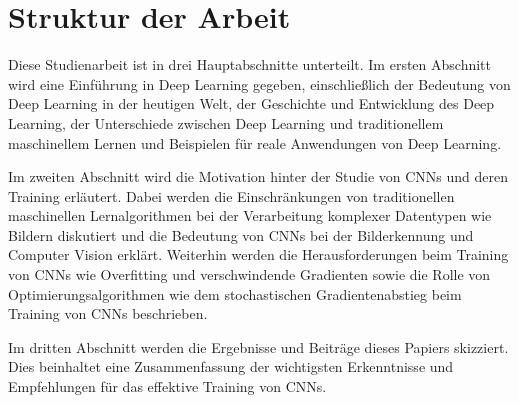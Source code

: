 \section{Struktur der Arbeit}

    Diese Studienarbeit ist in drei Hauptabschnitte unterteilt.
    Im ersten Abschnitt wird eine Einführung in Deep Learning gegeben, einschließlich der Bedeutung von Deep Learning in der heutigen Welt, der Geschichte und Entwicklung des Deep Learning, der Unterschiede zwischen Deep Learning und traditionellem maschinellem Lernen und Beispielen für reale Anwendungen von Deep Learning.
    
    Im zweiten Abschnitt wird die Motivation hinter der Studie von CNNs und deren Training erläutert. Dabei werden die Einschränkungen von traditionellen maschinellen Lernalgorithmen bei der Verarbeitung komplexer Datentypen wie Bildern diskutiert und die Bedeutung von CNNs bei der Bilderkennung und Computer Vision erklärt. Weiterhin werden die Herausforderungen beim Training von CNNs wie Overfitting und verschwindende Gradienten sowie die Rolle von Optimierungsalgorithmen wie dem stochastischen Gradientenabstieg beim Training von CNNs beschrieben.
    
    Im dritten Abschnitt werden die Ergebnisse und Beiträge dieses Papiers skizziert. Dies beinhaltet eine Zusammenfassung der wichtigsten Erkenntnisse und Empfehlungen für das effektive Training von CNNs.